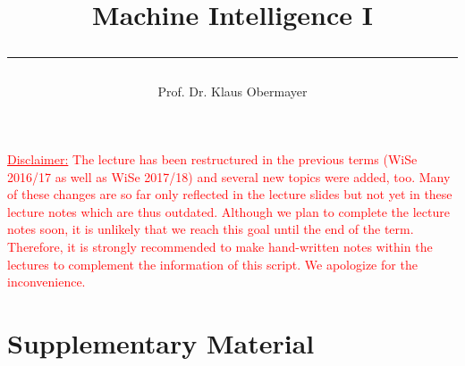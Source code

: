 % 
\title{Machine Intelligence I\\ \rule{0.75\textwidth}{2pt}}
\author{Prof. Dr. Klaus Obermayer}
	

\usepackage[backend=biber,style=authoryear,natbib=true, url=false, doi=true, firstinits=true, eprint=false]{biblatex}




\maketitle
\noindent \textcolor{red}{\underline{Disclaimer:} The lecture has been restructured in the previous terms (WiSe 2016/17 as well as WiSe 2017/18) and several new topics were added, too. Many of these changes are so far only reflected in the lecture slides but not yet in these lecture notes which are thus outdated. Although we plan to complete the lecture notes soon, it is unlikely that we reach this goal until the end of the term. Therefore, it is strongly recommended to make hand-written notes within the lectures to complement the information of this script. We apologize for the inconvenience.}
\newpage
\tableofcontents
\newpage


\newpage
\section{Supplementary Material}
\setcounter{equation}{0}









\printbibliography

